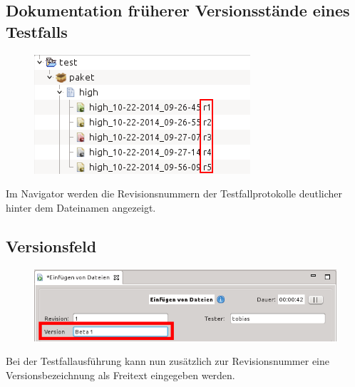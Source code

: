 \documentclass[11pt,a4paper,titlepage]{article}
\begin{document}
\subsection{Dokumentation früherer Versionsstände eines Testfalls}
\begin{figure}[H]
 \centering
 \includegraphics[width=\textwidth]{./BilderAenderungen/revisionsnummer-navigator.png}
\end{figure}
Im Navigator werden die Revisionsnummern der Testfallprotokolle deutlicher hinter dem Dateinamen angezeigt.

\subsection{Versionsfeld}
\begin{figure}[H]
\centering
\includegraphics[width=\textwidth]{./BilderAenderungen/versionsfeld.png}
\end{figure}
Bei der Testfallausführung kann nun zusätzlich zur Revisionsnummer eine Versionsbezeichnung als Freitext eingegeben werden.
\end{document}
